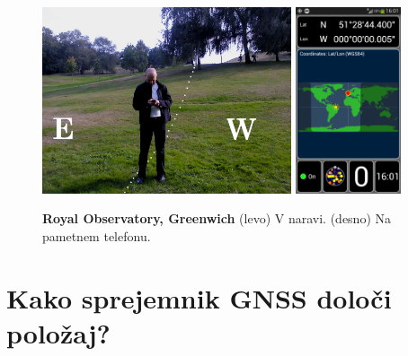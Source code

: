 \begin{figure}
	\centering
	\includegraphics[height=5.5cm]{Predavanja/05_SatLastPolozaj/figs/DSC00285_merid.png}
	\hspace*{1.0cm}
	\includegraphics[height=5.5cm]{Predavanja/05_SatLastPolozaj/figs/20140923_160146.png}\\
	\vspace*{0.25cm}
	\caption{\textbf{Royal Observatory, Greenwich} (levo) V naravi. (desno) Na pametnem telefonu.}
	\label{fig:GreenwichRO}       %
\end{figure} 





   





\section{Kako sprejemnik GNSS določi položaj?}
\label{Gnss_Polozaj}




